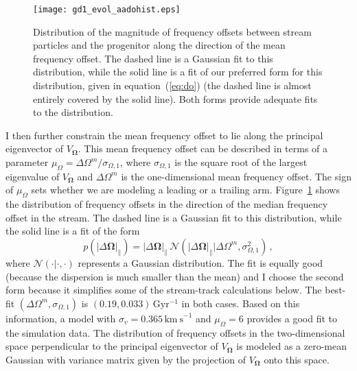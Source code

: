 \documentclass{emulateapj}
\newcommand{\eqnname}{equation}
\newcommand{\equationname}{\eqnname}
\renewcommand{\figurename}{Figure}
\renewcommand{\vec}[1]{\ensuremath{\mathbf{#1}}}
\newcommand{\veco}{\ensuremath{\vec{\Omega}}}
\newcommand{\sigv}{\ensuremath{\sigma_v}}
\newcommand{\Gyr}{\ensuremath{\,\mathrm{Gyr}}}
\newcommand{\kms}{\ensuremath{\,\mathrm{km\ s}^{-1}}}
\newcommand{\inv}{\ensuremath{^{-1}}}
\begin{document}
\begin{figure}[t!]
  \texttt{[image: gd1\_evol\_aadohist.eps]}
  \caption{Distribution of the magnitude of frequency offsets between
    stream particles and the progenitor along the direction of the
    mean frequency offset. The dashed line is a Gaussian fit to this
    distribution, while the solid line is a fit of our preferred form
    for this distribution, given in \equationname~(\ref{eq:do}) (the
    dashed line is almost entirely covered by the solid line). Both
    forms provide adequate fits to the
    distribution. }\label{fig:gd1_dohist}
\end{figure}

I then further constrain the mean frequency offset to lie along the
principal eigenvector of $V_\veco$. This mean frequency offset can be
described in terms of a parameter $\mu_\Omega = \Delta \Omega^m /
\sigma_{\Omega,1}$, where $\sigma_{\Omega,1}$ is the square root of
the largest eigenvalue of $V_\veco$ and $\Delta \Omega^m$ is the
one-dimensional mean frequency offset. The sign of $\mu_\Omega$ sets
whether we are modeling a leading or a trailing
arm. \figurename~\ref{fig:gd1_dohist} shows the distribution of
frequency offsets in the direction of the median frequency offset in
the stream. The dashed line is a Gaussian fit to this distribution,
while the solid line is a fit of the form
\begin{equation}\label{eq:do}
  p(|\Delta \veco|_\parallel) = |\Delta \veco|_\parallel\,\mathcal{N}\left(|\Delta \veco|_\parallel|\Delta \Omega^m,\sigma_{\Omega,1}^2\right)\,,
\end{equation}
where $\mathcal{N}(\cdot|\cdot,\cdot)$ represents a Gaussian
distribution. The fit is equally good (because the dispersion is much
smaller than the mean) and I choose the second form because it
simplifies some of the stream-track calculations below. The best-fit
$(\Delta \Omega^m,\sigma_{\Omega,1})$ is $(0.19,0.033)\Gyr\inv$ in
both cases. Based on this information, a model with $\sigv =
0.365\kms$ and $\mu_\Omega = 6$ provides a good fit to the simulation
data. The distribution of frequency offsets in the two-dimensional
space perpendicular to the principal eigenvector of $V_\veco$ is
modeled as a zero-mean Gaussian with variance matrix given by the
projection of $V_\veco$ onto this space.
\end{document}
